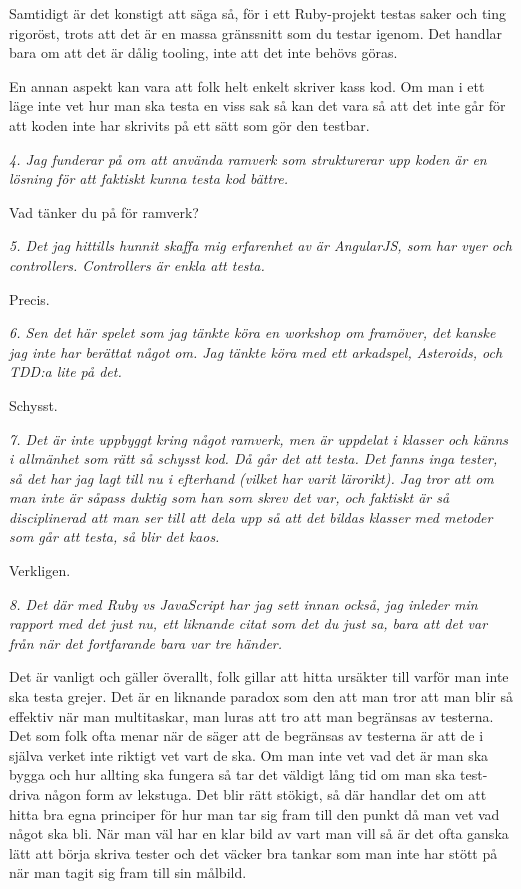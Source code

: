 \documentclass[11pt]{article}
\begin{document}
Samtidigt är det konstigt att säga så, för i ett Ruby-projekt testas saker och ting rigoröst, trots att det är en massa gränssnitt som du testar igenom. Det handlar bara om att det är dålig tooling, inte att det inte behövs göras.

En annan aspekt kan vara att folk helt enkelt skriver kass kod. Om man i ett läge inte vet hur man ska testa en viss sak så kan det vara så att det inte går för att koden inte har skrivits på ett sätt som gör den testbar.

\emph{4. Jag funderar på om att använda ramverk som strukturerar upp koden är en lösning för att faktiskt kunna testa kod bättre.}

Vad tänker du på för ramverk?

\emph{5. Det jag hittills hunnit skaffa mig erfarenhet av är AngularJS, som har vyer och controllers. Controllers är enkla att testa.}

Precis.

\emph{6. Sen det här spelet som jag tänkte köra en workshop om framöver, det kanske jag inte har berättat något om. Jag tänkte köra med ett arkadspel, Asteroids, och TDD:a lite på det.}

Schysst.

\emph{7. Det är inte uppbyggt kring något ramverk, men är uppdelat i klasser och känns i allmänhet som rätt så schysst kod. Då går det att testa. Det fanns inga tester, så det har jag lagt till nu i efterhand (vilket har varit lärorikt). Jag tror att om man inte är såpass duktig som han som skrev det var, och faktiskt är så disciplinerad att man ser till att dela upp så att det bildas klasser med metoder som går att testa, så blir det kaos.}

Verkligen.

\emph{8. Det där med Ruby vs JavaScript har jag sett innan också, jag inleder min rapport med det just nu, ett liknande citat som det du just sa, bara att det var från när det fortfarande bara var tre händer.}

Det är vanligt och gäller överallt, folk gillar att hitta ursäkter till varför man inte ska testa grejer. Det är en liknande paradox som den att man tror att man blir så effektiv när man multitaskar, man luras att tro att man begränsas av testerna. Det som folk ofta menar när de säger att de begränsas av testerna är att de i själva verket inte riktigt vet vart de ska. Om man inte vet vad det är man ska bygga och hur allting ska fungera så tar det väldigt lång tid om man ska test-driva någon form av lekstuga. Det blir rätt stökigt, så där handlar det om att hitta bra egna principer för hur man tar sig fram till den punkt då man vet vad något ska bli. När man väl har en klar bild av vart man vill så är det ofta ganska lätt att börja skriva tester och det väcker bra tankar som man inte har stött på när man tagit sig fram till sin målbild.
\end{document}

